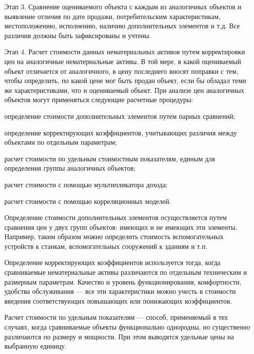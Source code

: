 Этап 3. Сравнение оцениваемого объекта с каждым из аналогичных объектов и выявление отличия по дате продажи, потребительским характеристикам, местоположению, исполнению, наличию дополнительных элементов и т.д. Все различия должны быть зафиксированы и учтены.

Этап 4. Расчет стоимости данных нематериальных активов путем корректировки цен на аналогичные нематериальные активы. В той мере, в какой оцениваемый объект отличается от аналогичного, в цену последнего вносят поправки с тем, чтобы определить, по какой цене мог быть продан объект, если бы обладал теми же характеристиками, что и оцениваемый объект. При анализе цен аналогичных объектов могут применяться следующие расчетные процедуры:

\begin{list}{}{\leftmargin=1.5cm}
	\item определение стоимости дополнительных элементов путем парных сравнений;
	\item определение корректирующих коэффициентов, учитывающих различия между объектами по отдельным параметрам;
	\item расчет стоимости по удельным стоимостным показателям, единым для определения группы аналогичных объектов;
	\item расчет стоимости с помощью мультипликатора дохода;
	\item расчет стоимости с помощью корреляционных моделей.
\end{list}

Определение стоимости дополнительных элементов осуществляется путем сравнения цен у двух групп объектов: имеющих и не имеющих эти элементы. Например, таким образом можно определить стоимость вспомогательных устройств к станкам, вспомогательных сооружений к зданиям и т.п.

Определение корректирующих коэффициентов используется тогда, когда сравниваемые нематериальные активы различаются по отдельным техническим и размерным параметрам. Качество и уровень функционирования, комфортности, удобства обслуживания --- все эти характеристики можно учесть в стоимости введения соответствующих повышающих или понижающих коэффициентов.

Расчет стоимости по удельным показателям --- способ, применяемый в тех случаях, когда сравниваемые объекты функционально однородны, но существенно различаются по размеру и мощности. При этом выводятся удельные цены на выбранную единицу. 


